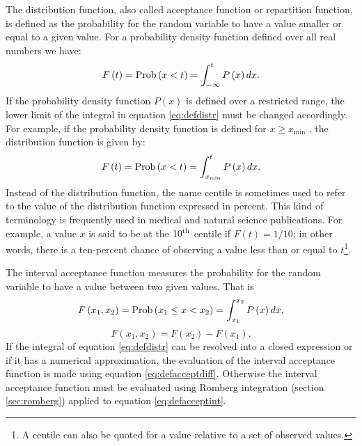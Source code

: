 \documentclass[twoside]{book}
\begin{document}
The distribution function, also called acceptance function or
repartition function, is defined as the probability for the random
variable to have a value smaller or equal to a given value. For a
probability density function defined over all real numbers we
have:
\begin{equation}
\label{eq:defdistr}
  F\left(t\right)=\mathop{\rm Prob}\left(x<t\right)=\int_{-\infty}^t P\left(x\right)
  dx.
\end{equation}
If the probability density function $P\left(x\right)$ is defined
over a restricted range, the lower limit of the integral in
equation \ref{eq:defdistr} must be changed accordingly. For
example, if the probability density function is defined for $x\geq
x_{\min}$ , the distribution function is given by:
\begin{equation}
\label{eq:defdistrmin}
  F\left(t\right)=\mathop{\rm Prob}\left(x<t\right)=\int_{x_{\min}}^t P\left(x\right)
  dx.
\end{equation}
Instead of the distribution function,  the name centile is
sometimes used to refer to the value of the distribution function
expressed in percent. This kind of terminology is frequently used
in medical and natural science publications. For example, a value
$x$ is said to be at the $10^{\mathop{\rm th}}$ centile if
$F\left(t\right)=1/10$; in other words, there is a ten-percent
chance of observing a value less than or equal to $t$\footnote{A
centile can also be quoted for a value relative to a set of
observed values.}.

The interval acceptance function measures the probability for the
random variable to have a value between two given values. That is
\begin{equation}
\label{eq:defacceptint}
  F\left(x_1,x_2\right)=\mathop{\rm Prob}\left(x_1\le x<x_2\right)
  =\int_{x_1}^{x_2} P\left(x\right)dx,
\end{equation}
\begin{equation}
\label{eq:defacceptdiff}
  F\left(x_1,x_2\right)=F\left(x_2\right)-F\left(x_1\right).
\end{equation}
If the integral of equation \ref{eq:defdistr} can be resolved into
a closed expression or if it has a numerical approximation, the
evaluation of the interval acceptance function is made using
equation \ref{eq:defacceptdiff}. Otherwise the interval acceptance
function must be evaluated using Romberg integration (\cf section
\ref{sec:romberg}) applied to equation \ref{eq:defacceptint}.
\end{document}
